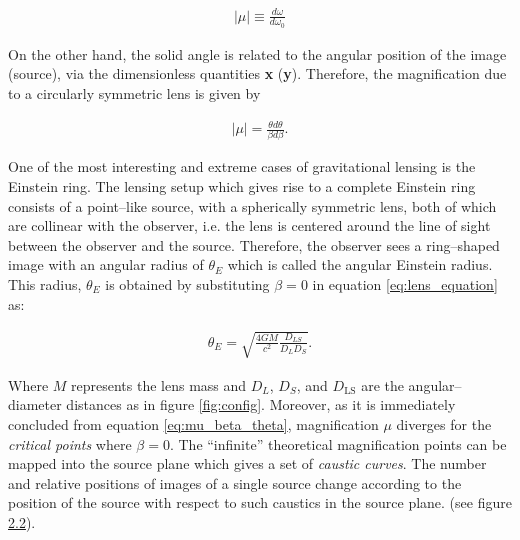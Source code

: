 \documentclass[paper=a4, fontsize=11pt]{scrartcl} %
\numberwithin{equation}{section} %
\numberwithin{figure}{section} %
\numberwithin{table}{section} %
\begin{document}
\begin{eqnarray}
\label{eq:mu_domegas}
|\mu| \equiv \frac{d\omega}{d\omega_0}
\end{eqnarray}

On the other hand, the solid angle is related to the angular position of the image (source), via the dimensionless quantities \textbf{x} (\textbf{y}). Therefore, the magnification due to a circularly symmetric lens is given by 

\begin{eqnarray}
\label{eq:mu_beta_theta}
|\mu| = \frac{\theta d\theta}{\beta d\beta}.
\end{eqnarray}

One of the most interesting and extreme cases of gravitational lensing is the Einstein ring. The lensing setup which gives rise to a complete Einstein ring consists of a point--like source, with a spherically symmetric lens, both of which are collinear with the observer, i.e. the lens is centered around the line of sight between the observer and the source. Therefore, the observer sees a ring--shaped image with an angular radius of $\theta_E$ which is called the angular Einstein radius. This radius, $\theta_E$ is obtained by substituting $\beta=0$ in equation \ref{eq:lens_equation} as:

 \begin{eqnarray}
 \theta_E = \sqrt{\frac{4GM}{c^2}\frac{D_{LS}}{D_LD_S}}.
 \label{eq:lens}
 \end{eqnarray}

 Where $M$ represents the lens mass and $D_L$, $D_S$, and $D_\mathrm{LS}$ are the angular--diameter distances as in figure \ref{fig:config}. Moreover, as it is immediately concluded from equation \ref{eq:mu_beta_theta}, magnification $\mu$ diverges for the \emph{critical points} where $\beta=0$. The ``infinite'' theoretical magnification points can be mapped into the source plane which gives a set of \emph{caustic curves}. The number and relative positions of images of a single source change according to the position of the source with respect to such caustics in the source plane. (see figure \hyperref[fig:cusps]{2.2}).
\end{document}

